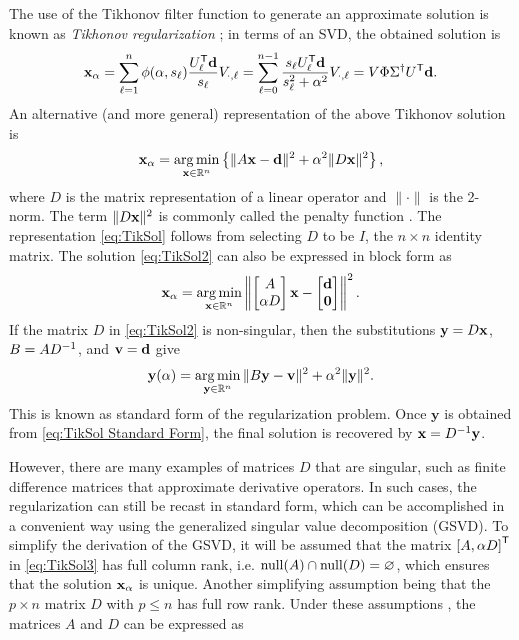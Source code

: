 The use of the Tikhonov filter function to generate an approximate solution is known as \textit{Tikhonov regularization} \cite{Tikh1963}; in terms of an SVD, the obtained solution is
\begin{equation}
\mathbf{x}_\alpha = \sum_{\ell = 1}^n \phi(\alpha,s_\ell)\frac{{{U}^\mathsf{T}_\ell}\mathbf{d}}{s_\ell}V_{\cdot,\ell} = \sum_{\ell = 0}^{n-1} \frac{s_\ell{{U}^\mathsf{T}_\ell}\mathbf{d}}{s_\ell^2 + \alpha^2}V_{\cdot,\ell} = V\Phi\Sigma^\dagger {U}^\mathsf{T}\mathbf{d}.
\label{eq:TikSol}
\end{equation}
An alternative (and more general) representation of the above Tikhonov solution is
\begin{equation}
\mathbf{x}_\alpha = \operatorname*{arg\,min}_{\mathbf{x} \in \mathbb{R}^n} \left\{\|A\mathbf{x} - \mathbf{d}\|^2 + \alpha^2\|D\mathbf{x}\|^2\right\},
\label{eq:TikSol2}
\end{equation}
where $D$ is the matrix representation of a linear operator and $\|\cdot\|$ is the 2-norm. The term $\|D\mathbf{x}\|^2$ is commonly called the penalty function \cite{Vogel:2002}. The representation \eqref{eq:TikSol} follows from selecting $D$ to be $I$, the $n \times n$ identity matrix. The solution \eqref{eq:TikSol2} can also be expressed in block form as
\begin{equation}
\mathbf{x}_\alpha = \operatorname*{arg\,min}_{\mathbf{x} \in \mathbb{R}^n} \left\| \begin{bmatrix}
A \\
\alpha D
\end{bmatrix}\mathbf{x} - \begin{bmatrix}
\mathbf{d} \\
\bm{0}
\end{bmatrix} \right\|^2.
\label{eq:TikSol3}
\end{equation}
If the matrix $D$ in \eqref{eq:TikSol2} is non-singular, then the substitutions $\mathbf{y} = D\mathbf{x}$, $B = A{D}^{-1}$, and $\mathbf{v} = \mathbf{d}$ give
\begin{equation}
\mathbf{y}(\alpha) = \operatorname*{arg\,min}_{\mathbf{y} \in \mathbb{R}^n} \|B\mathbf{y} - \mathbf{v}\|^2 + \alpha^2\|\mathbf{y}\|^2.
\label{eq:TikSol Standard Form}
\end{equation}
This is known as standard form of the regularization problem. Once $\mathbf{y}$ is obtained from \eqref{eq:TikSol Standard Form}, the final solution is recovered by $\mathbf{x} = {D}^{-1}\mathbf{y}$.  \par 
However, there are many examples of matrices $D$ that are singular, such as finite difference matrices that approximate derivative operators. In such cases, the regularization can still be recast in standard form, which can be accomplished in a convenient way using the generalized singular value decomposition (GSVD). To simplify the derivation of the GSVD, it will be assumed that the matrix ${[A, \alpha D]}^\mathsf{T}$ in \eqref{eq:TikSol3} has full column rank, i.e. $\operatorname{null}(A) \cap \operatorname{null}(D) = \varnothing$, which ensures that the solution $\mathbf{x}_\alpha$ is unique. Another simplifying assumption being that the $p \times n$ matrix $D$ with $p \leq n$ has full row rank. Under these assumptions \cite[p.~104]{ABT}, the matrices $A$ and $D$ can be expressed as
